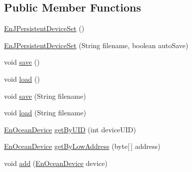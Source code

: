 \subsection*{Public Member Functions}
\begin{DoxyCompactItemize}
\item 
\hyperlink{classit_1_1polito_1_1elite_1_1enocean_1_1enj_1_1application_1_1devices_1_1_en_j_persistent_device_set_a6c30c67b0c3e54a3a0091cfb05df6232}{En\+J\+Persistent\+Device\+Set} ()
\item 
\hyperlink{classit_1_1polito_1_1elite_1_1enocean_1_1enj_1_1application_1_1devices_1_1_en_j_persistent_device_set_aa69cd41d1ba054a8e06e9804af3d26d8}{En\+J\+Persistent\+Device\+Set} (String filename, boolean auto\+Save)
\item 
void \hyperlink{classit_1_1polito_1_1elite_1_1enocean_1_1enj_1_1application_1_1devices_1_1_en_j_persistent_device_set_a7fcef06b5c7c011279764d7ee7c9f197}{save} ()
\item 
void \hyperlink{classit_1_1polito_1_1elite_1_1enocean_1_1enj_1_1application_1_1devices_1_1_en_j_persistent_device_set_a13bc35a583634a2431401840653e26eb}{load} ()
\item 
void \hyperlink{classit_1_1polito_1_1elite_1_1enocean_1_1enj_1_1application_1_1devices_1_1_en_j_persistent_device_set_ad1001d18cfbe70797cb694246c490b00}{save} (String filename)
\item 
void \hyperlink{classit_1_1polito_1_1elite_1_1enocean_1_1enj_1_1application_1_1devices_1_1_en_j_persistent_device_set_a18a9c586f55a1184abf29ac3cf641f26}{load} (String filename)
\item 
\hyperlink{classit_1_1polito_1_1elite_1_1enocean_1_1enj_1_1model_1_1_en_ocean_device}{En\+Ocean\+Device} \hyperlink{classit_1_1polito_1_1elite_1_1enocean_1_1enj_1_1application_1_1devices_1_1_en_j_persistent_device_set_a8576d4b4bef0c29aa095e910eceddd5a}{get\+By\+U\+ID} (int device\+U\+ID)
\item 
\hyperlink{classit_1_1polito_1_1elite_1_1enocean_1_1enj_1_1model_1_1_en_ocean_device}{En\+Ocean\+Device} \hyperlink{classit_1_1polito_1_1elite_1_1enocean_1_1enj_1_1application_1_1devices_1_1_en_j_persistent_device_set_adf0068a56b5a2e628ef4c16cf407ceaa}{get\+By\+Low\+Address} (byte\mbox{[}$\,$\mbox{]} address)
\item 
void \hyperlink{classit_1_1polito_1_1elite_1_1enocean_1_1enj_1_1application_1_1devices_1_1_en_j_persistent_device_set_a7fe31fb9797352c0476ef5a8b8607f4b}{add} (\hyperlink{classit_1_1polito_1_1elite_1_1enocean_1_1enj_1_1model_1_1_en_ocean_device}{En\+Ocean\+Device} device)

\end{DoxyCompactItemize}
